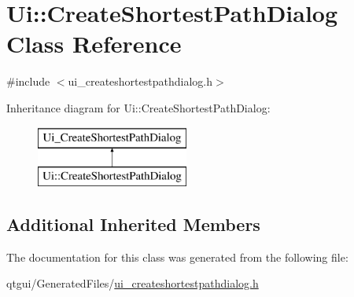 \hypertarget{class_ui_1_1_create_shortest_path_dialog}{}\section{Ui\+::Create\+Shortest\+Path\+Dialog Class Reference}
\label{class_ui_1_1_create_shortest_path_dialog}


{\ttfamily \#include $<$ui\+\_\+createshortestpathdialog.\+h$>$}

Inheritance diagram for Ui\+::Create\+Shortest\+Path\+Dialog\+:\begin{figure}[H]
\begin{center}
\leavevmode
\includegraphics[height=2.000000cm]{d1/d54/class_ui_1_1_create_shortest_path_dialog}
\end{center}
\end{figure}
\subsection*{Additional Inherited Members}


The documentation for this class was generated from the following file\+:\begin{DoxyCompactItemize}
\item 
qtgui/\+Generated\+Files/\mbox{\hyperlink{ui__createshortestpathdialog_8h}{ui\+\_\+createshortestpathdialog.\+h}}\end{DoxyCompactItemize}
